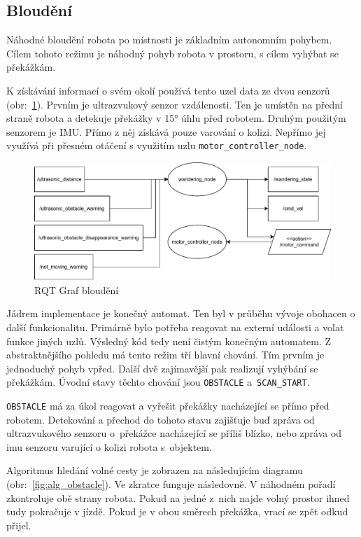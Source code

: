 \subsection*{Bloudění}
Náhodné bloudění robota po místnosti je základním autonomním pohybem. Cílem tohoto režimu je náhodný pohyb robota v prostoru, s cílem vyhýbat se překážkám.

K získávání informací o svém okolí používá tento uzel data ze dvou senzorů (obr:~\ref{fig:rqt_wandering}). Prvním je ultrazvukový senzor vzdálenosti. Ten je umístěn na přední straně robota a detekuje překážky v 15° úhlu před robotem. Druhým použitým senzorem je IMU. Přímo z něj získává pouze varování o kolizi. Nepřímo jej využívá při přesném otáčení s využitím uzlu \verb|motor_controller_node|.

\begin{figure}[h!]
	\centering
	\includegraphics[scale=0.75]{obrazky-figures/wandering_rqt.pdf}
	\caption{RQT Graf bloudění}
	\label{fig:rqt_wandering}
\end{figure}

Jádrem implementace je konečný automat. Ten byl v průběhu vývoje obohacen o další funkcionalitu. Primárně bylo potřeba reagovat na externí události a volat funkce jiných uzlů. Výsledný kód tedy není čistým konečným automatem. Z abstraktnějšího pohledu má tento režim tří hlavní chování. Tím prvním je jednoduchý pohyb vpřed. Další dvě zajímavější pak realizují vyhýbání se překážkám. Úvodní stavy těchto chování jsou \verb|OBSTACLE| a~\verb|SCAN_START|.

\verb|OBSTACLE| má za úkol reagovat a vyřešit překážky nacházející se přímo před robotem. Detekování a přechod do tohoto stavu zajišťuje buď zpráva od ultrazvukového senzoru o~překážce nacházející se příliš blízko, nebo zpráva od imu senzoru varující o kolizi robota s~objektem.

Algoritmus hledání volné cesty je zobrazen na následujícím diagramu (obr:~\ref{fig:alg_obstacle}). Ve zkratce funguje následovně. V náhodném pořadí zkontroluje obě strany robota. Pokud na jedné z~nich najde volný prostor ihned tudy pokračuje v jízdě. Pokud je v obou směrech překážka, vrací se zpět odkud přijel.

